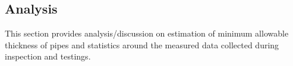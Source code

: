 %			


\subsection{Analysis} 
This section provides analysis/discussion on estimation of minimum allowable thickness of pipes and statistics around the measured data collected during inspection and testings.



